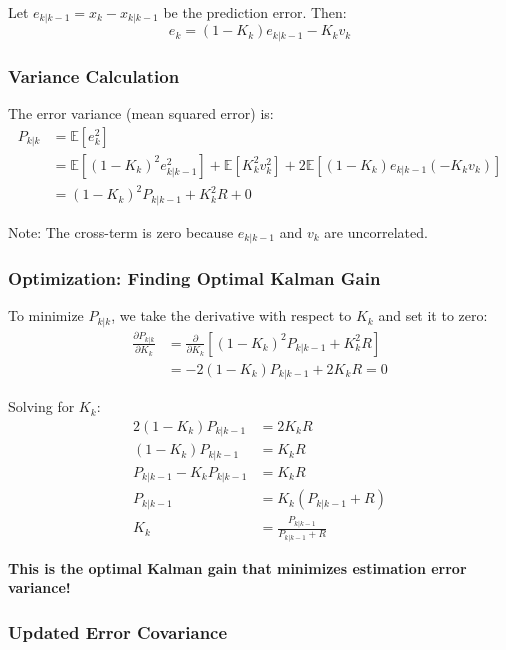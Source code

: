 \documentclass{article}
\begin{document}
Let $e_{k|k-1} = x_k - \hat{x}_{k|k-1}$ be the prediction error. Then:
\begin{equation}
e_k = (1-K_k)e_{k|k-1} - K_k v_k \label{eq:error_final}
\end{equation}

\subsubsection{Variance Calculation}

The error variance (mean squared error) is:
\begin{align}
P_{k|k} &= \mathbb{E}[e_k^2] \\
&= \mathbb{E}[(1-K_k)^2 e_{k|k-1}^2] + \mathbb{E}[K_k^2 v_k^2] + 2\mathbb{E}[(1-K_k)e_{k|k-1}(-K_k v_k)] \\
&= (1-K_k)^2 P_{k|k-1} + K_k^2 R + 0 \label{eq:variance_expanded}
\end{align}

Note: The cross-term is zero because $e_{k|k-1}$ and $v_k$ are uncorrelated.

\subsubsection{Optimization: Finding Optimal Kalman Gain}

To minimize $P_{k|k}$, we take the derivative with respect to $K_k$ and set it to zero:
\begin{align}
\frac{\partial P_{k|k}}{\partial K_k} &= \frac{\partial}{\partial K_k}[(1-K_k)^2 P_{k|k-1} + K_k^2 R] \\
&= -2(1-K_k)P_{k|k-1} + 2K_k R = 0 \label{eq:derivative}
\end{align}

Solving for $K_k$:
\begin{align}
2(1-K_k)P_{k|k-1} &= 2K_k R \\
(1-K_k)P_{k|k-1} &= K_k R \\
P_{k|k-1} - K_k P_{k|k-1} &= K_k R \\
P_{k|k-1} &= K_k(P_{k|k-1} + R) \\
K_k &= \frac{P_{k|k-1}}{P_{k|k-1} + R} \label{eq:optimal_gain}
\end{align}

\textbf{This is the optimal Kalman gain that minimizes estimation error variance!}

\subsubsection{Updated Error Covariance}
\end{document}
